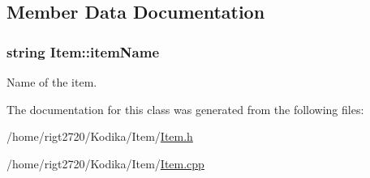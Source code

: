 \subsection{Member Data Documentation}
\hypertarget{classItem_af7a09a8db2072c632d84a992e76408b9}{
\subsubsection[{item\-Name}]{\setlength{\rightskip}{0pt plus 5cm}string Item\-::item\-Name\hspace{0.3cm}{\ttfamily [protected]}}}\label{classItem_af7a09a8db2072c632d84a992e76408b9}


Name of the item. 



The documentation for this class was generated from the following files\-:\begin{DoxyCompactItemize}
\item 
/home/rigt2720/\-Kodika/\-Item/\hyperlink{Item_8h}{Item.\-h}\item 
/home/rigt2720/\-Kodika/\-Item/\hyperlink{Item_8cpp}{Item.\-cpp}\end{DoxyCompactItemize}
